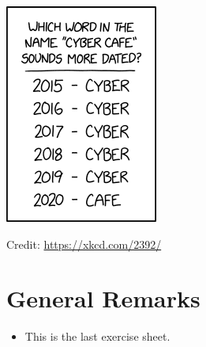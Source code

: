 \documentclass[a4paper]{article}
\begin{document}

\begin{onlysolution}
  \begin{center}
    \includegraphics[scale=0.5]{xkcd_2392}

    \scriptsize Credit: \href{https://xkcd.com/2392/}{https://xkcd.com/2392/}
  \end{center}
\end{onlysolution}

\section*{General Remarks}
\begin{itemize}
  \item This is the last exercise sheet.
\end{itemize}




\end{document}
